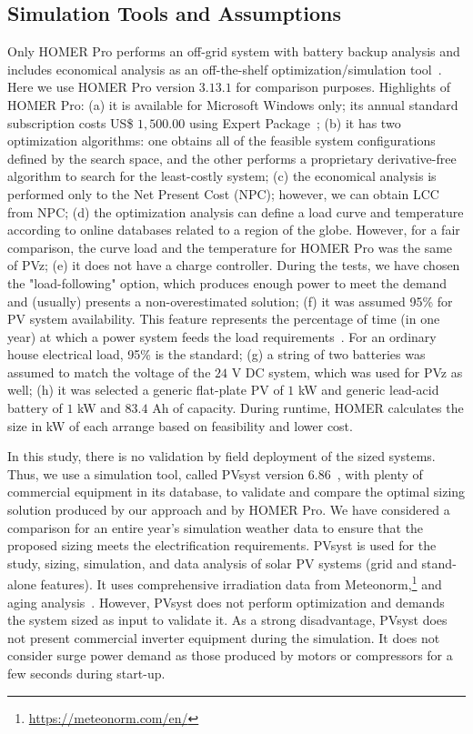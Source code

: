 \documentclass[review]{elsarticle}
\begin{document}
\subsection{Simulation Tools and Assumptions}
\label{sec:SimulationToolsandAssumptions}

Only HOMER Pro performs an off-grid system with battery backup analysis and includes economical analysis as an off-the-shelf optimization/simulation tool~\citep{Pradhan,Swarnkar}. Here we use HOMER Pro version $3.13.1$ for comparison purposes. Highlights of HOMER Pro:
%
(a) it is available for Microsoft Windows only; its annual standard subscription costs US\$ $1,500.00$ using Expert Package~\citep{HOMER};
(b) it has two optimization algorithms: one obtains all of the feasible system configurations defined by the search space, and the other performs a proprietary derivative-free algorithm to search for the least-costly system;
(c) the economical analysis is performed only to the Net Present Cost (NPC); however, we can obtain LCC from NPC; 
(d) the optimization analysis can define a load curve and temperature according to online databases related to a region of the globe. However, for a fair comparison, the curve load and the temperature for HOMER Pro was the same of PVz; 
(e) it does not have a charge controller. During the tests, we have chosen the "load-following" option, which produces enough power to meet the demand~\citep{HOMER} and (usually) presents a non-overestimated solution; 
(f) it was assumed 95\% for PV system availability. This feature represents the percentage of time (in one year) at which a power system feeds the load requirements~\citep{Khatib2014}. For an ordinary house electrical load, 95\% is the standard;
(g) a string of two batteries was assumed to match the voltage of the $24$ V DC system, which was used for PVz as well; 
(h) it was selected a generic flat-plate PV of $1$ kW and generic lead-acid battery of $1$ kW and $83.4$ Ah of capacity. During runtime, HOMER calculates the size in kW of each arrange based on feasibility and lower cost.

In this study, there is no validation by field deployment of the sized systems. Thus, we use a simulation tool, called PVsyst version $6.86$~\citep{PVsyst}, with plenty of commercial equipment in its database, to validate and compare the optimal sizing solution produced by our approach and by HOMER Pro. We have considered a comparison for an entire year's simulation weather data to ensure that the proposed sizing meets the electrification requirements. PVsyst is used for the study, sizing, simulation, and data analysis of solar PV systems (grid and stand-alone features). It uses comprehensive irradiation data from Meteonorm,\footnote{\href{https://meteonorm.com/en/}{https://meteonorm.com/en/}} and aging analysis~\citep{PVsyst2017}. However, PVsyst does not perform optimization and demands the system sized as input to validate it. As a strong disadvantage, PVsyst does not present commercial inverter equipment during the simulation. It does not consider surge power demand as those produced by motors or compressors for a few seconds during start-up. 
\end{document}
